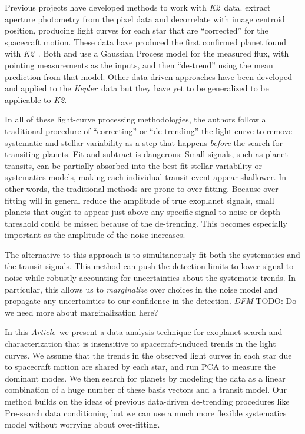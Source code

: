 \documentclass[12pt,preprint]{aastex}
\newcommand{\project}[1]{\textsl{#1}} %
\newcommand{\kepler}{\project{Kepler}}
\newcommand{\KT}{\project{K2}}
\newcommand{\pdc}{\project{PDC}}
\newcommand{\paper}{\textsl{Article}}
\newcommand{\todo}[3]{{\color{#2} \emph{#1} TODO: #3}}
\newcommand{\dfmtodo}[1]{\todo{DFM}{red}{#1}}
\begin{document}
Previous projects have developed methods to work with \KT\ data.
\citet{Vanderburg:2014} extract aperture photometry from the pixel data
and decorrelate with image centroid position, producing light curves for each
star that are ``corrected'' for the spacecraft motion.
These data have produced the first confirmed planet found with
\KT\ \citep{Vanderburg:2015}.
Both \citet{Aigrain:2015} and \citet{Crossfield:2015} use a Gaussian Process
model for the measured flux, with pointing measurements as the inputs, and
then ``de-trend'' using the mean prediction from that model.
Other data-driven approaches have been developed and applied to the \kepler\
data \citep[for example,][]{pdc1, pdc2, arc, dun} but they have yet to be
generalized to be applicable to \KT.

In all of these light-curve processing methodologies, the authors follow a
traditional procedure of ``correcting'' or ``de-trending'' the light curve to
remove systematic and stellar variability as a step that happens \emph{before}
the search for transiting planets.
Fit-and-subtract is dangerous: Small signals, such as planet transits, can be
partially absorbed into the best-fit stellar variability or systematics
models, making each individual transit event appear shallower.
In other words, the traditional methods are prone to over-fitting.
Because over-fitting will in general reduce the amplitude of true exoplanet
signals, small planets that ought to appear just above any specific
signal-to-noise or depth threshold could be missed because of the de-trending.
This becomes especially important as the amplitude of the noise increases.

The alternative to this approach is to simultaneously fit both the systematics
and the transit signals.
This method can push the detection limits to lower signal-to-noise while
robustly accounting for uncertainties about the systematic trends.
In particular, this allows us to \emph{marginalize} over choices in the noise
model and propagate any uncertainties to our confidence in the detection.
\dfmtodo{Do we need more about marginalization here?}

In this \paper\ we present a data-analysis technique for exoplanet search and
characterization that is insensitive to spacecraft-induced trends in the light
curves.
We assume that the trends in the observed light curves in each star due to
spacecraft motion are shared by each star, and run PCA to measure the dominant
modes.
We then search for planets by modeling the data as a linear combination of a
huge number of these basis vectors and a transit model.
Our method builds on the ideas of previous data-driven de-trending procedures
like Pre-search data conditioning \citep[\pdc;][]{pdc1, pdc2} but we can use a
much more flexible systematics model without worrying about over-fitting.
\end{document}
